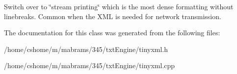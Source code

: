 \label{class_ti_xml_printer_ab23a90629e374cb1cadca090468bbd19}
Switch over to \char`\"{}stream printing\char`\"{} which is the most dense formatting without linebreaks. Common when the XML is needed for network transmission. 

The documentation for this class was generated from the following files:\begin{DoxyCompactItemize}
\item 
/home/cshome/m/mabrams/345/txtEngine/tinyxml.h\item 
/home/cshome/m/mabrams/345/txtEngine/tinyxml.cpp\end{DoxyCompactItemize}
